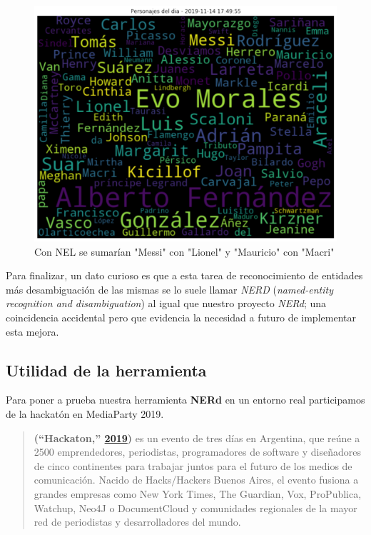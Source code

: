 \documentclass[12pt,a4paper,]{scrartcl}
\begin{document}
\begin{figure}[H]

{\centering \includegraphics{assets/LosPersonajesDelDia.pdf} 

}

\caption{Con NEL se sumarían "Messi" con "Lionel" y "Mauricio" con "Macri"}\label{fig:fig-cloud}
\end{figure}

Para finalizar, un dato curioso es que a esta tarea de reconocimiento de entidades más desambiguación de las mismas se lo suele llamar \emph{NERD} (\emph{named-entity recognition and disambiguation}) al igual que nuestro proyecto \emph{NERd}; una coincidencia accidental pero que evidencia la necesidad a futuro de implementar esta mejora.

\hypertarget{utilidad-de-la-herramienta}{%
\subsection{Utilidad de la herramienta}\label{utilidad-de-la-herramienta}}

Para poner a prueba nuestra herramienta \textbf{NERd} en un entorno real participamos de la hackatón en MediaParty 2019.

\begin{quote}
\textbf{(``Hackaton,'' \protect\hyperlink{ref-hackaton2019}{2019})} es un evento de tres días en Argentina, que reúne a 2500 emprendedores, periodistas, programadores de software y diseñadores de cinco continentes para trabajar juntos para el futuro de los medios de comunicación.
Nacido de Hacks/Hackers Buenos Aires, el evento fusiona a grandes empresas como New York Times, The Guardian, Vox, ProPublica, Watchup, Neo4J o DocumentCloud y comunidades regionales de la mayor red de periodistas y desarrolladores del mundo.
\end{quote}
\end{document}
